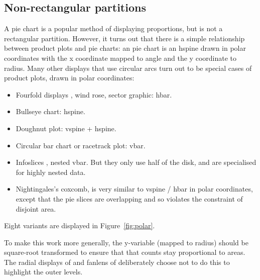 \documentclass[journal]{vgtc}
\begin{document}
\subsection{Non-rectangular partitions}

A pie chart is a popular method of displaying proportions, but is not a rectangular partition. However, it turns out that there is a simple relationship between product plots and pie charts: an pie chart is an hspine drawn in polar coordinates with the x coordinate mapped to angle and the y coordinate to radius. Many other displays that use circular arcs turn out to be special cases of product plots, drawn in polar coordinates:

\begin{itemize}
  \item Fourfold displays \citep{friendly:1995}, wind rose, sector graphic: hbar.

  \item Bullseye chart: hspine.

  \item Doughnut plot: vspine + hspine.

  \item Circular bar chart or racetrack plot: vbar.

  \item Infoslices \citep{andrews:1998}, nested vbar. But they only use half of the disk, and are specialised for highly nested data.

  \item Nightingales's coxcomb, is very similar to vspine / hbar in polar coordinates, except that the pie slices are overlapping and so violates the constraint of disjoint area.
\end{itemize}

\noindent Eight variants are displayed in Figure~\ref{fig:polar}.

To make this work more generally, the y-variable (mapped to radius) should be square-root transformed to ensure that that counts stay proportional to areas. The radial displays of \citet{stasko:2000} and fanlens of \citet{lou:2007} deliberately choose not to do this to highlight the outer levels.
\end{document}
